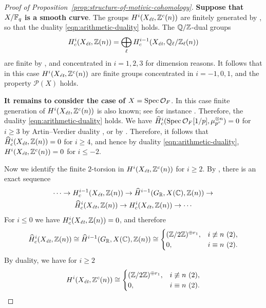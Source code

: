 \documentclass[draft]{article}
\numberwithin{equation}{section}
\begin{document}
\begin{proof}[Proof of Proposition~\ref{prop:structure-of-motivic-cohomology}]
  \vspace{1em}

  \textbf{Suppose that $X/\FF_q$ is a smooth curve}. The groups
  $H^i (X_\et, \ZZ^c (n))$ are finitely generated by
  \cite[Proposition~4.3]{Geisser-2017}, so that the duality
  \eqref{eqn:arithmetic-duality} holds. The $\QQ/\ZZ$-dual groups
  \[ H^i_c (X_\et, \ZZ(n)) =
    \bigoplus_\ell H^{i-1}_c (X_\et, \QQ_\ell/\ZZ_\ell (n)) \]
  are finite by \cite[Theorem~3]{Kahn-2003}, and concentrated in
  $i = 1,2,3$ for dimension reasons. It follows that in this case
  $H^i (X_\et, \ZZ^c (n))$ are finite groups concentrated in $i = -1,0,1$,
  and the property $\mathcal{P} (X)$ holds.

  \vspace{1em}

  \textbf{It remains to consider the case of $X = \Spec \mathcal{O}_F$}.
  In this case finite generation of $H^i (X_\et, \ZZ^c (n))$ is also known; see
  for instance \cite[Proposition~4.14]{Geisser-2017}. Therefore, the duality
  \eqref{eqn:arithmetic-duality} holds. We have
  $\widehat{H}^i_c (\Spec \mathcal{O}_F [1/p], \mu_{p^r}^{\otimes n}) = 0$ for
  $i \ge 3$ by Artin--Verdier duality
  \cite[Chapter~II, Corollary~3.3]{Milne-ADT}, or by
  \cite[p.\,268]{Soule-1979}. Therefore, it follows that
  $\widehat{H}^i_c (X_\et, \ZZ (n)) = 0$ for $i \ge 4$, and hence by duality
  \eqref{eqn:arithmetic-duality}, $H^i (X_\et, \ZZ^c (n)) = 0$ for $i \le -2$.

  Now we identify the finite $2$-torsion in $H^i (X_\et, \ZZ^c (n))$ for
  $i \ge 2$. By \cite[Lemma~6.14]{Flach-Morin-2018}, there is an exact
  sequence
  \begin{multline}
    \label{eqn:les-Hc-vs-H-hat-c}
    \cdots \to H^{i-1}_c (X_\et, \ZZ (n)) \to
    \widehat{H}^{i-1} (G_\RR, X(\CC), \ZZ (n)) \to \\
    \widehat{H}^i_c (X_\et, \ZZ (n)) \to
    H^i_c (X_\et, \ZZ (n)) \to \cdots
  \end{multline}
  For $i \le 0$ we have $H^i_c (X_\et, \ZZ (n)) = 0$, and therefore
  \[ \widehat{H}^i_c (X_\et, \ZZ (n)) \cong
    \widehat{H}^{i-1} (G_\RR, X(\CC), \ZZ (n)) \cong
    \begin{cases}
      (\ZZ/2\ZZ)^{\oplus r_1}, & i\not\equiv n ~ (2), \\
      0, & i\equiv n ~ (2).
    \end{cases} \]
  By duality, we have for $i \ge 2$
  \[ H^i (X_\et, \ZZ^c (n)) \cong
    \begin{cases}
      (\ZZ/2\ZZ)^{\oplus r_1}, & i\not\equiv n ~ (2), \\
      0, & i\equiv n ~ (2).
    \end{cases} \]


\end{proof}
\end{document}
